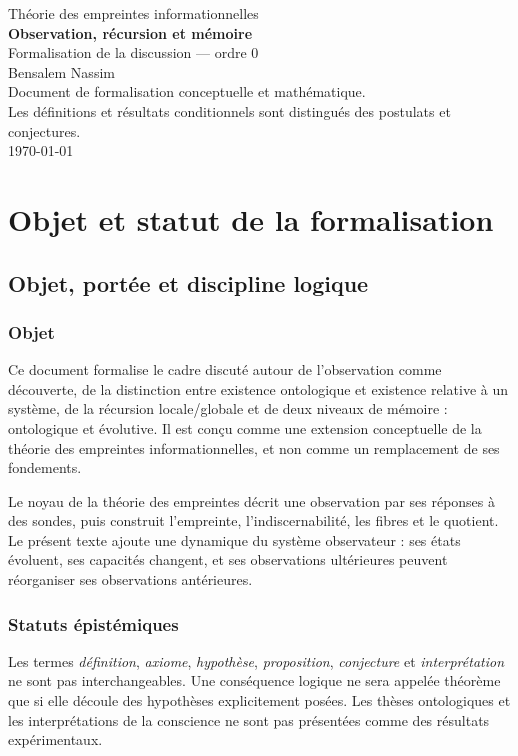 \documentclass[11pt,a4paper,openany]{book}
\begin{document}
\frontmatter
\begin{titlepage}
\centering
{\Large Théorie des empreintes informationnelles}\\[1cm]
{\Huge\bfseries Observation, récursion et mémoire}\\[0.5cm]
{\Large Formalisation de la discussion — ordre 0}\\[1.5cm]
Bensalem Nassim\\[1cm]
\vfill
Document de formalisation conceptuelle et mathématique.\\
Les définitions et résultats conditionnels sont distingués des postulats et conjectures.\\
\today
\end{titlepage}
\tableofcontents
\mainmatter

\part{Objet et statut de la formalisation}
\chapter{Objet, portée et discipline logique}

\section{Objet}
Ce document formalise le cadre discuté autour de l'observation comme découverte, de la distinction entre existence ontologique et existence relative à un système, de la récursion locale/globale et de deux niveaux de mémoire : ontologique et évolutive. Il est conçu comme une extension conceptuelle de la théorie des empreintes informationnelles, et non comme un remplacement de ses fondements.

Le noyau de la théorie des empreintes décrit une observation par ses réponses à des sondes, puis construit l'empreinte, l'indiscernabilité, les fibres et le quotient. Le présent texte ajoute une dynamique du système observateur : ses états évoluent, ses capacités changent, et ses observations ultérieures peuvent réorganiser ses observations antérieures.

\section{Statuts épistémiques}
Les termes \emph{définition}, \emph{axiome}, \emph{hypothèse}, \emph{proposition}, \emph{conjecture} et \emph{interprétation} ne sont pas interchangeables.
Une conséquence logique ne sera appelée théorème que si elle découle des hypothèses explicitement posées. Les thèses ontologiques et les interprétations de la conscience ne sont pas présentées comme des résultats expérimentaux.
\end{document}
